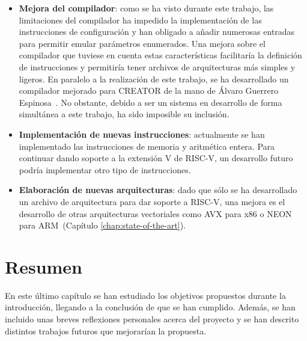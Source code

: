 \begin{itemize}
    \item \textbf{Mejora del compilador}: como se ha visto durante este trabajo, las limitaciones del compilador ha impedido la implementación de las instrucciones de configuración y han obligado a añadir numerosas entradas para permitir emular parámetros enumerados. Una mejora sobre el compilador que tuviese en cuenta estas características facilitaría la definición de instrucciones y permitiría tener archivos de arquitecturas más simples y ligeros. En paralelo a la realización de este trabajo, se ha desarrollado un compilador mejorado para CREATOR de la mano de Álvaro Guerrero Espinosa~\cite{creatorcompiler}. No obstante, debido a ser un sistema en desarrollo de forma simultánea a este trabajo, ha sido imposible su inclusión.

    \item\textbf{Implementación de nuevas instrucciones}: actualmente se han implementado las instrucciones de memoria y aritmética entera. Para continuar dando soporte a la extensión V de RISC-V, un desarrollo futuro podría implementar otro tipo de instrucciones.

    \item\textbf{Elaboración de nuevas arquitecturas}: dado que sólo se ha desarrollado un archivo de arquitectura para dar soporte a RISC-V, una mejora es el desarrollo de otras arquitecturas vectoriales como AVX para x86 o NEON para ARM~(Capítulo \ref{chap:state-of-the-art}).

\end{itemize}

\section{Resumen}

En este último capítulo se han estudiado los objetivos propuestos durante la introducción, llegando a la conclusión de que se han cumplido. Además, se han incluido unas breves reflexiones personales acerca del proyecto y se han descrito distintos trabajos futuros que mejorarían la propuesta.
